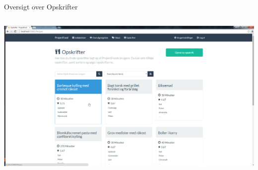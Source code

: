 \begin{frame}{Oversigt over Opskrifter}

	
	\begin{minipage}[0.3\textheight]{\textwidth}
	\begin{columns}[T]
	\begin{column}{1\textwidth}
	 \includegraphics[width=1\textwidth,height=1\textheight,keepaspectratio, trim={1cm 0 0 16mm}, clip]{images/Screenshots/Recipe.png}
	
	\end{column}

	\end{columns}

  \end{minipage}
	
\end{frame}

